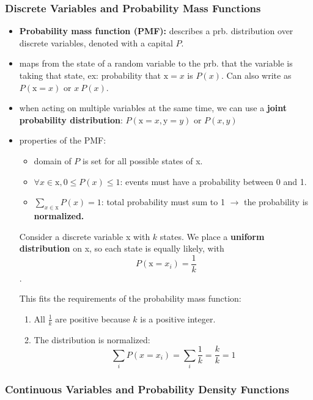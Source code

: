 \subsubsection{Discrete Variables and Probability Mass Functions}
\begin{itemize}
    \item \textbf{Probability mass function (PMF):} describes a prb. distribution over discrete variables, denoted with a capital $P$.
    \item maps from the state of a random variable to the prb. that the variable is taking that state, ex: probability that $\text{x} = x$ is $P(x)$.
    Can also write as $P(\text{x} = x)$ or $x ~ P(x)$.
    \item when acting on multiple variables at the same time, we can use a \textbf{joint probability distribution}: $P(\text{x} = x, \text{y} = y)$ or $P(x, y)$
    \item properties of the PMF:
    \begin{itemize}
        \item domain of $P$ is set for all possible states of x.
        \item $\forall x \in \text{x}, 0 \leq P(x) \leq 1$: events must have a probability between 0 and 1.
        \item $\sum_{x \in \text{x}} P(x) = 1$: total probability must sum to 1 $\rightarrow$ the probability is \textbf{normalized.}
    \end{itemize}
    \begin{example}
        Consider a discrete variable x with $k$ states. We place a \textbf{uniform distribution} on x, so each state is equally likely, with
        $$ P(\text{x} = x_i) = \frac{1}{k} $$.

        This fits the requirements of the probability mass function:
        \begin{enumerate}
            \item All $\frac{1}{k}$ are positive because $k$ is a positive integer.
            \item The distribution is normalized: 
            $$ \sum_{i} P(x = x_i) = \sum_{i} \frac{1}{k} = \frac{k}{k} = 1 $$
        \end{enumerate}
    \end{example}
\end{itemize}

\subsubsection{Continuous Variables and Probability Density Functions}
